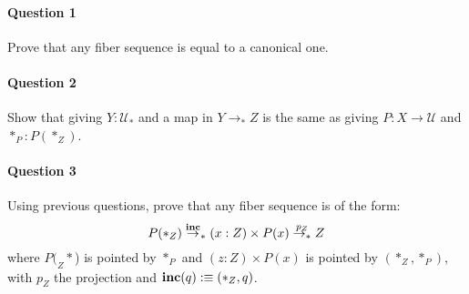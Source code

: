 \documentclass{article}[6pt]%
\newcommand{\U}{{\mathcal U}}
\renewcommand{\r}{\rightarrow}
\newcommand{\inc}{\mathrm{\bf inc}}
\begin{document}
\begin{Exercise}[title={Canonical fiber sequence},difficulty=1]

\paragraph{Question 1} Prove that any fiber sequence is equal to a canonical one.

\paragraph{Question 2} Show that giving $Y:\U_*$ and a map in $Y\r_* Z$ is the same as giving $P:X\r \U$ and $*_P:P(*_Z)$.

\paragraph{Question 3} Using previous questions, prove that any fiber sequence is of the form:
 \[P(*_Z) \overset{\inc}\r_* (x:Z)\times P(x)\overset{p_Z}{\r_*} Z\]
 where $P(_Z*$) is pointed by $*_P$ and $(z:Z)\times P(x)$ is pointed by $(*_Z,*_P)$, with $p_Z$ the projection and $\inc(q):\equiv (*_Z,q)$.
\end{Exercise}
\end{document}
